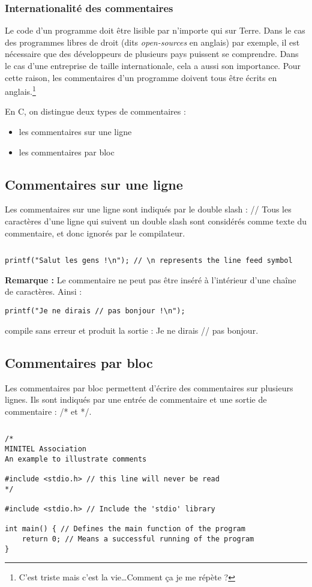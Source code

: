\documentclass[../../../main.tex]{subfiles}
\begin{document}
\subsubsection{Internationalité des commentaires}
 
Le code d'un programme doit être lisible par n'importe qui sur Terre. Dans le cas des programmes libres de droit (dits \textit{open-sources} en anglais) par exemple, il est nécessaire que des développeurs de plusieurs pays puissent se comprendre. Dans le cas d'une entreprise de taille internationale, cela a aussi son importance. Pour cette raison, les commentaires d'un programme doivent tous être écrits en anglais.\footnote{C'est triste mais c'est la vie\dots Comment ça je me répète ?}
 
En C, on distingue deux types de commentaires :
\begin{itemize}
	\item les commentaires sur une ligne
	\item les commentaires par bloc
\end{itemize}
\subsection{Commentaires sur une ligne}
Les commentaires sur une ligne sont indiqués par le double slash : \textsf{//} \newline
Tous les caractères d'une ligne qui suivent un double slash sont considérés comme texte du commentaire, et donc ignorés par le compilateur.
\begin{lstlisting}[title=Exemple]
\end{lstlisting}
\begin{verbatim}
printf("Salut les gens !\n"); // \n represents the line feed symbol
\end{verbatim}
\textbf{Remarque :} Le commentaire ne peut pas être inséré à l'intérieur d'une chaîne de caractères. Ainsi :
\begin{verbatim}
printf("Je ne dirais // pas bonjour !\n");
\end{verbatim}
compile sans erreur et produit la sortie : \textsf{Je ne dirais // pas bonjour}.
\subsection{Commentaires par bloc}
Les commentaires par bloc permettent d'écrire des commentaires sur plusieurs lignes. Ils sont indiqués par une entrée de commentaire et une sortie de commentaire : \textsf{/*} et \textsf{*/}.
\begin{lstlisting}[title=Exemple]
\end{lstlisting}
\begin{verbatim}
/*
MINITEL Association
An example to illustrate comments

#include <stdio.h> // this line will never be read
*/

#include <stdio.h> // Include the 'stdio' library

int main() { // Defines the main function of the program
	return 0; // Means a successful running of the program
}
\end{verbatim}
\end{document}
